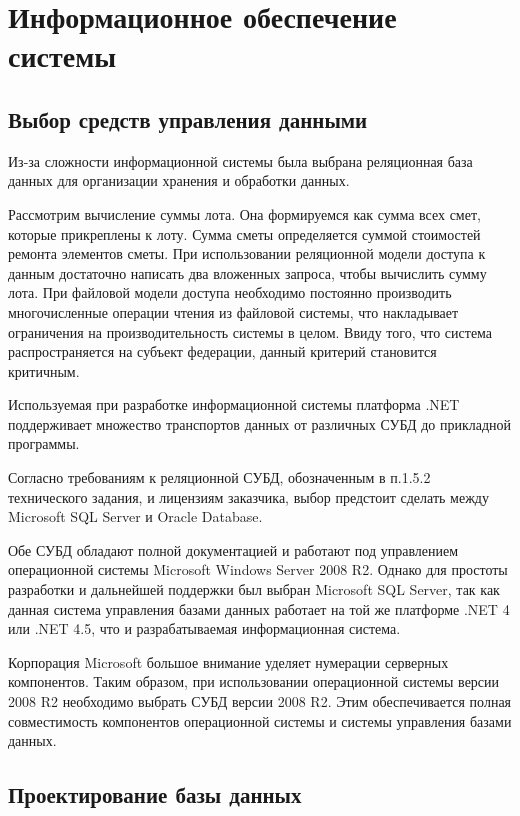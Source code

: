 \section{Информационное обеспечение системы}

\subsection{Выбор средств управления данными}

Из-за сложности информационной системы была выбрана реляционная база данных для организации хранения и обработки данных.

Рассмотрим вычисление суммы лота.
Она формируемся как сумма всех смет, которые прикреплены к лоту.
Сумма сметы определяется суммой стоимостей ремонта элементов сметы.
При использовании реляционной модели доступа к данным достаточно написать два вложенных запроса, чтобы вычислить сумму лота.
При файловой модели доступа необходимо постоянно производить многочисленные операции чтения из файловой системы, что накладывает ограничения на производительность системы в целом.
Ввиду того, что система распространяется на субъект федерации, данный критерий становится критичным.

Используемая при разработке информационной системы платформа .NET поддерживает множество транспортов данных от различных СУБД до прикладной программы.

Согласно требованиям к реляционной СУБД, обозначенным в п.1.5.2 технического задания, и лицензиям заказчика, выбор предстоит сделать между Microsoft SQL Server и Oracle Database.

Обе СУБД обладают полной документацией и работают под управлением операционной системы Microsoft Windows Server 2008 R2.
Однако для простоты разработки и дальнейшей поддержки был выбран Microsoft SQL Server, так как данная система управления базами данных работает на той же платформе .NET 4 или .NET 4.5, что и разрабатываемая информационная система.

Корпорация Microsoft большое внимание уделяет нумерации серверных компонентов.
Таким образом, при использовании операционной системы версии 2008 R2 необходимо выбрать СУБД версии 2008 R2.
Этим обеспечивается полная совместимость компонентов операционной системы и системы управления базами данных.

\subsection{Проектирование базы данных}

